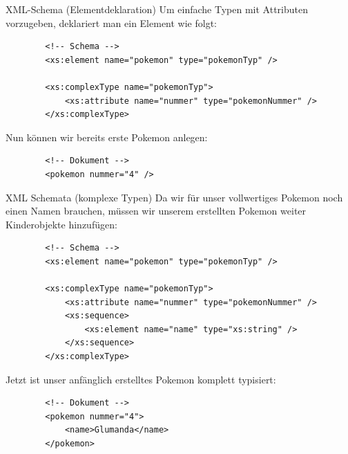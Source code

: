 \begin{example}{XML-Schema (Elementdeklaration)}
    Um einfache Typen mit Attributen vorzugeben, deklariert man ein Element wie folgt:

    \begin{lstlisting}
        <!-- Schema -->
        <xs:element name="pokemon" type="pokemonTyp" />

        <xs:complexType name="pokemonTyp">
            <xs:attribute name="nummer" type="pokemonNummer" />
        </xs:complexType>
    \end{lstlisting}

    Nun können wir bereits erste Pokemon anlegen:

    \begin{lstlisting}
        <!-- Dokument -->
        <pokemon nummer="4" />
    \end{lstlisting}
\end{example}

\begin{example}{XML Schemata (komplexe Typen)}
    Da wir für unser vollwertiges Pokemon noch einen Namen brauchen, müssen wir unserem erstellten Pokemon weiter Kinderobjekte hinzufügen:

    \begin{lstlisting}
        <!-- Schema -->
        <xs:element name="pokemon" type="pokemonTyp" />

        <xs:complexType name="pokemonTyp">
            <xs:attribute name="nummer" type="pokemonNummer" />
            <xs:sequence>
                <xs:element name="name" type="xs:string" />
            </xs:sequence>
        </xs:complexType>
    \end{lstlisting}

    Jetzt ist unser anfänglich erstelltes Pokemon komplett typisiert:

    \begin{lstlisting}
        <!-- Dokument -->
        <pokemon nummer="4">
            <name>Glumanda</name>
        </pokemon>
    \end{lstlisting}
\end{example}

